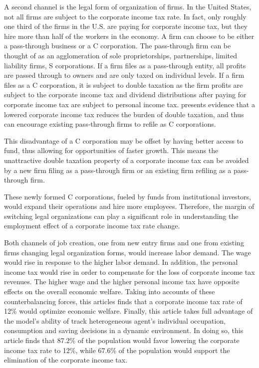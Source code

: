\documentclass[12pt]{article}
\begin{document}
A second channel is the legal form of organization of firms. In the United States, not all firms are subject to the corporate income tax rate. In fact, only roughly one third of the firms in the U.S. are paying for corporate income tax, but they hire more than half of the workers in the economy. A firm can choose to be either a pass-through business or a C corporation. The pass-through firm can be thought of as an agglomeration of sole proprietorships, partnerships, limited liability firms, S corporations. If a firm files as a pass-through entity, all profits are passed through to owners and are only taxed on individual levels. If a firm files as a C corporation, it is subject to double taxation as the firm profits are subject to the corporate income tax and dividend distributions after paying for corporate income tax are subject to personal income tax. \citet{Goolsbee2004} presents evidence that a lowered corporate income tax reduces the burden of double taxation, and thus can encourage existing pass-through firms to refile as C corporations. 

This disadvantage of a C corporation may be offset by having better access to fund, thus allowing for opportunities of faster growth. This means the unattractive double taxation property of a corporate income tax can be avoided by a new firm filing as a pass-through firm or an existing firm refiling as a pass-through firm. 

These newly formed C corporations, fueled by funds from institutional investors, would expand their operations and hire more employees. Therefore, the margin of switching legal organizations can play a significant role in understanding the employment effect of a corporate income tax rate change.

Both channels of job creation, one from new entry firms and one from existing firms changing legal organization forms, would increase labor demand. The wage would rise in response to the higher labor demand. In addition, the personal income tax would rise in order to compensate for the loss of corporate income tax revenues. The higher wage and the higher personal income tax have opposite effects on the overall economic welfare. Taking into accounts of these counterbalancing forces, this articles finds that a corporate income tax rate of 12\% would optimize economic welfare. Finally, this article takes full advantage of the model's ability of track heterogeneous agent's individual occupation, consumption and saving decisions in a dynamic environment. In doing so, this article finds that 87.2\% of the population would favor lowering the corporate income tax rate to 12\%, while 67.6\% of the population would support the elimination of the corporate income tax.
\end{document}
